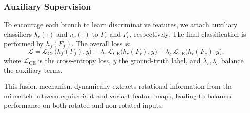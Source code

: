 \subsubsection{Auxiliary Supervision}
To encourage each branch to learn discriminative features, we attach auxiliary classifiers $h_r(\cdot)$ and $h_c(\cdot)$ to $F_r$ and $F_c$, respectively. The final classification is performed by $h_f(F_f)$. The overall loss is:
\[
\mathcal{L} = \mathcal{L}_{\mathrm{CE}}\bigl(h_f(F_f), y\bigr) + \lambda_r \, \mathcal{L}_{\mathrm{CE}}\bigl(h_r(F_r), y\bigr) + \lambda_c \, \mathcal{L}_{\mathrm{CE}}\bigl(h_c(F_c), y\bigr),
\]
where $\mathcal{L}_{\mathrm{CE}}$ is the cross-entropy loss, $y$ the ground-truth label, and $\lambda_r,\lambda_c$ balance the auxiliary terms.

This fusion mechanism dynamically extracts rotational information from the mismatch between equivariant and variant feature maps, leading to balanced performance on both rotated and non-rotated inputs.